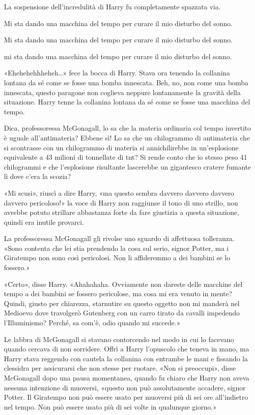 La sospensione dell’incredulità di Harry fu completamente spazzata via.

Mi sta dando una macchina del tempo per curare il mio disturbo del sonno.

Mi sta dando una macchina del tempo per curare il mio disturbo del sonno.

mi sta dando una macchina del tempo per curare il mio disturbo del sonno.

«Ehehehehhheheh…» fece la bocca di Harry. Stava ora tenendo la collanina lontana da sé come se fosse una bomba innescata. Beh, no, non come una bomba innescata, questo paragone non coglieva neppure lontanamente la gravità della situazione. Harry tenne la collanina lontana da sé come se fosse una macchina del tempo.

Dica, professoressa McGonagall, lo sa che la materia ordinaria col tempo invertito è uguale all’antimateria? Ebbene sì! Lo sa che un chilogrammo di antimateria che si scontrasse con un chilogrammo di materia si annichilirebbe in un’esplosione equivalente a 43 milioni di tonnellate di tnt? Si rende conto che io stesso peso 41 chilogrammi e che l’esplosione risultante lascerebbe un gigantesco cratere fumante lì dove c’era la scozia?

«Mi scusi», riuscì a dire Harry, «ma questo sembra davvero davvero davvero davvero pericoloso!» la voce di Harry non raggiunse il tono di uno strillo, non avrebbe potuto strillare abbastanza forte da fare giustizia a questa situazione, quindi era inutile provarci.

La professoressa McGonagall gli rivolse uno sguardo di affettuosa tolleranza. «Sono contenta che lei stia prendendo la cosa sul serio, signor Potter, ma i Giratempo non sono così pericolosi. Non li affideremmo a dei bambini se lo fossero.»

«Certo», disse Harry. «Ahahahaha. Ovviamente non dareste delle macchine del tempo a dei bambini se fossero pericolose, ma cosa mi era venuto in mente? Quindi, giusto per chiarezza, starnutire su questo oggetto non mi manderà nel Medioevo dove travolgerò Gutenberg con un carro tirato da cavalli impedendo l’Illuminismo? Perché, sa com’è, odio quando mi succede.»

Le labbra di McGonagall si stavano contorcendo nel modo in cui lo facevano quando cercava di non sorridere. Offrì a Harry l’opuscolo che teneva in mano, ma Harry stava reggendo con cautela la collanina con entrambe le mani e fissando la clessidra per assicurarsi che non stesse per ruotare. «Non si preoccupi», disse McGonagall dopo una pausa momentanea, quando fu chiaro che Harry non aveva nessuna intenzione di muoversi, «questo non può assolutamente accadere, signor Potter. Il Giratempo non può essere usato per muoversi più di sei ore all’indietro nel tempo. Non può essere usato più di sei volte in qualunque giorno.»


